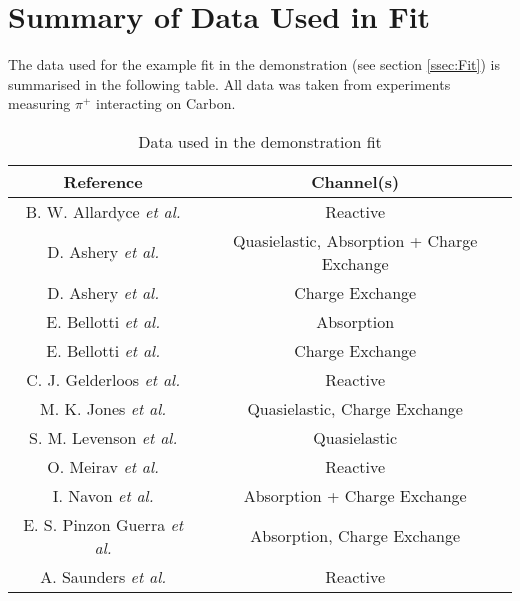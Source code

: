 \documentclass[12pt]{article}
\begin{document}
\section{Summary of Data Used in Fit}\label{app:Data_refs}
The data used for the example fit in the demonstration (see section \ref{ssec:Fit}) is summarised in the following table. All data was taken from experiments measuring $\pi^+$ interacting on Carbon.
\begin{table}[htpb]
\begin{center}
  \begin{tabular}{| c | c |}
  \hline
  \textbf{Reference} & \textbf{Channel(s)}\\  
  \hline	
  \hline
  B. W. Allardyce \textit{et al.}\cite{Allardyce} & Reactive \\
  \hline
  D. Ashery \textit{et al.}\cite{Ashery_1} & Quasielastic, Absorption + Charge Exchange \\ 
  \hline
  D. Ashery \textit{et al.}\cite{Ashery_2} & Charge Exchange \\ 
  \hline
  E. Bellotti \textit{et al.}\cite{Bellotti_1} & Absorption \\ 
  \hline
  E. Bellotti \textit{et al.}\cite{Bellotti_2} & Charge Exchange \\ 
  \hline  
  C. J. Gelderloos \textit{et al.}\cite{Gelderloos} & Reactive \\
  \hline  
  M. K. Jones \textit{et al.}\cite{Jones} & Quasielastic, Charge Exchange \\ 
  \hline
  S. M. Levenson \textit{et al.}\cite{Levenson} & Quasielastic \\
  \hline
  O. Meirav \textit{et al.}\cite{Meirav} & Reactive \\
  \hline
  I. Navon \textit{et al.}\cite{Navon} & Absorption + Charge Exchange \\
  \hline
  E. S. Pinzon Guerra \textit{et al.}\cite{DUET} & Absorption, Charge Exchange \\
  \hline
  A. Saunders \textit{et al.}\cite{Saunders} & Reactive \\
  \hline  
  \end{tabular}
\end{center}
\caption{Data used in the demonstration fit}\label{tab:fit_data}
\end{table}
\end{document}
